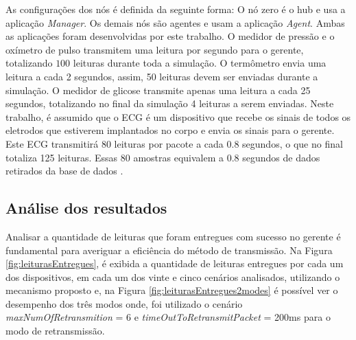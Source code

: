 As configurações dos nós é definida da seguinte forma: O nó zero é o hub e usa a aplicação \textit{Manager}. Os demais nós são agentes e usam a aplicação \textit{Agent}. Ambas as aplicações foram desenvolvidas por este trabalho. O medidor de pressão e o oxímetro de pulso transmitem uma leitura por segundo para o gerente, totalizando $100$ leituras durante toda a simulação. O termômetro envia uma leitura a cada 2 segundos, assim, 50 leituras devem ser enviadas durante a simulação. O medidor de glicose transmite apenas uma leitura a cada 25 segundos, totalizando no final da simulação 4 leituras a serem enviadas. Neste trabalho, é assumido que o ECG é um dispositivo que recebe os sinais de todos os eletrodos que estiverem implantados no corpo e envia os sinais para o gerente. Este ECG transmitirá $80$ leituras por pacote a cada $0.8$ segundos, o que no final totaliza 125 leituras. Essas $80$ amostras equivalem a $0.8$ segundos de dados retirados da base de dados \cite{b2}.

\subsection{Análise dos resultados}


Analisar a quantidade de leituras que foram entregues com sucesso no gerente é fundamental para averiguar a eficiência do método de transmissão. Na Figura \ref{fig:leiturasEntregues}, é exibida a quantidade de leituras entregues por cada um dos dispositivos, em cada um dos vinte e cinco cenários analisados, utilizando o mecanismo proposto e, na Figura \ref{fig:leiturasEntregues2modes} é possível ver o desempenho dos três modos onde, foi utilizado o cenário \textit{maxNumOfRetransmition} = 6 e \textit{timeOutToRetransmitPacket} = 200ms para o modo de retransmissão. 

